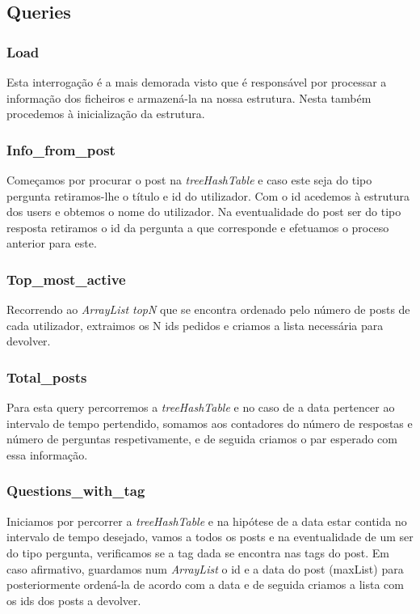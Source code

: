 \documentclass[10pt,a4paper]{article}
\begin{document}
\subsection{Queries}
\subsubsection{Load}
Esta interrogação é a mais demorada visto que é responsável por processar a informação dos ficheiros e armazená-la na nossa estrutura. Nesta também procedemos à inicialização da estrutura.

\subsubsection{Info\_from\_post}
Começamos por procurar o post na \textit{treeHashTable} e caso este seja do tipo pergunta retiramos-lhe o título e id do utilizador. Com o id acedemos à estrutura dos users e obtemos o nome do utilizador. Na eventualidade do post ser do tipo resposta retiramos o id da pergunta a que corresponde e efetuamos o proceso anterior para este.

\subsubsection{Top\_most\_active}
Recorrendo ao \textit{ArrayList topN} que se encontra ordenado pelo número de posts de cada utilizador, extraimos os N ids pedidos e criamos a lista necessária para devolver. 

\subsubsection{Total\_posts}
Para esta query percorremos a \textit{treeHashTable} e no caso de a data pertencer ao intervalo de tempo pertendido, somamos aos contadores do número de respostas e número de perguntas respetivamente, e de seguida criamos o par esperado com essa informação.

\subsubsection{Questions\_with\_tag}
Iniciamos por percorrer a \textit{treeHashTable} e na hipótese de a data estar contida no intervalo de tempo desejado, vamos a todos os posts e na eventualidade de um ser do tipo pergunta, verificamos se a tag dada se encontra nas tags do post. Em caso afirmativo, guardamos num \textit{ArrayList} o id e a data do post (maxList) para posteriormente ordená-la de acordo com a data e de seguida criamos a lista com os ids dos posts a devolver.
\end{document}
